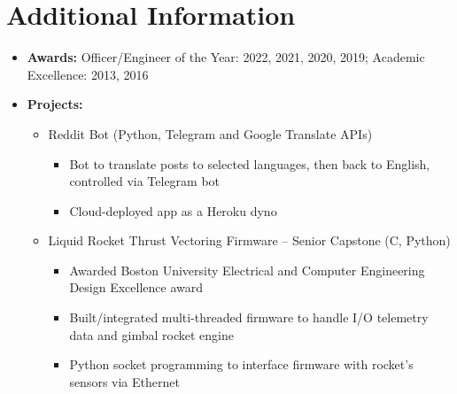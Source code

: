\documentclass{article}
\begin{document}

\section{Additional Information} 
\begin{itemize}
    \itemsep0.2em
    \item \textbf{Awards: }Officer/Engineer of the Year: 2022, 2021, 2020, 2019; Academic Excellence: 2013, 2016
    \item \textbf{Projects: }
    \vspace{-\topsep} \vspace{0.2em}
    \begin{itemize}
        \itemsep0em
        \item Reddit Bot (Python, Telegram and Google Translate APIs)
        \vspace{-\topsep} \vspace{0.2em}
        \begin{itemize}
            \itemsep0em
            \item Bot to translate posts to selected languages, then back to English, controlled via Telegram bot
            \item Cloud-deployed app as a Heroku dyno
        \end{itemize}
        \item Liquid Rocket Thrust Vectoring Firmware – Senior Capstone (C, Python)
        \vspace{-\topsep} \vspace{0.2em}
        \begin{itemize}
            \itemsep0em
            \item Awarded Boston University Electrical and Computer Engineering Design Excellence award
            \item Built/integrated multi-threaded firmware to handle I/O telemetry data and gimbal rocket engine
            \item Python socket programming to interface firmware with rocket’s sensors via Ethernet
        \end{itemize}
    \end{itemize} \end{itemize} 

\end{document}
